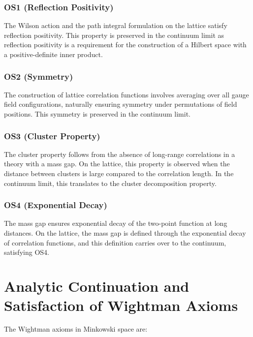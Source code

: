 \subsubsection*{OS1 (Reflection Positivity)}

The Wilson action and the path integral formulation on the lattice satisfy reflection positivity. This property is preserved in the continuum limit as reflection positivity is a requirement for the construction of a Hilbert space with a positive-definite inner product.

\subsubsection*{OS2 (Symmetry)}

The construction of lattice correlation functions involves averaging over all gauge field configurations, naturally ensuring symmetry under permutations of field positions. This symmetry is preserved in the continuum limit.

\subsubsection*{OS3 (Cluster Property)}

The cluster property follows from the absence of long-range correlations in a theory with a mass gap. On the lattice, this property is observed when the distance between clusters is large compared to the correlation length. In the continuum limit, this translates to the cluster decomposition property.

\subsubsection*{OS4 (Exponential Decay)}

The mass gap ensures exponential decay of the two-point function at long distances. On the lattice, the mass gap is defined through the exponential decay of correlation functions, and this definition carries over to the continuum, satisfying OS4.



\section{Analytic Continuation and Satisfaction of Wightman Axioms}

The Wightman axioms in Minkowski space are:

